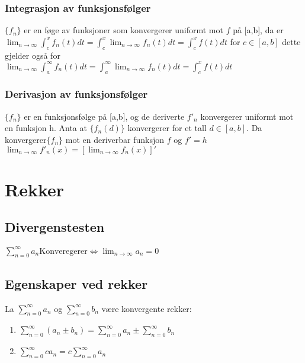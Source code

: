 \documentclass[8pt,a4paper,twocolumn,twoside]{article}
\begin{document}
            \subsubsection*{Integrasjon av funksjonsfølger}
            $\{f_n\}$ er en føge av funksjoner som konvergerer uniformt mot $f$ på [a,b], da er $\lim_{n\to\infty}\int_c^x f_n(t)dt = \int_c^x\lim_{n\to\infty}f_n(t)dt=\int_c^xf(t)dt$
            for $c \in [a,b]$ dette gjelder også for\\ $\lim_{n\to\infty}\int_a^\infty f_n(t)dt = \int_a^\infty\lim_{n\to\infty}f_n(t)dt=\int_c^xf(t)dt$
            \subsubsection*{Derivasjon av funksjonsfølger}
            $\{f_n\}$ er en funksjonsfølge på [a,b], og de deriverte $f'_n$ konvergerer uniformt mot en funksjon h. Anta 
            at $\{f_n(d)\}$ konvergerer for et tall $d\in [a,b]$. Da konvergerer$\{f_n\}$ mot en deriverbar funksjon $f$ og $f'=h$\\
            $\lim_{n\to\infty}f'_n(x)=[\lim_{n\to\infty}f_n(x)]'$
            
    \section*{Rekker}
        \subsection*{Divergenstesten}
        $\sum_{n=0}^\infty a_n \text{Konveregerer} \Leftrightarrow \lim_{n\to\infty}a_n=0$
        \subsection*{Egenskaper ved rekker}
        La $\sum_{n=0}^\infty a_n$ og $\sum_{n=0}^\infty b_n$ være konvergente rekker:
        \begin{enumerate}[topsep = 0pt,partopsep = 0pt, itemsep = 0cm]
            \item $\sum_{n=0}^\infty (a_n \pm b_n) = \sum_{n=0}^\infty a_n \pm \sum_{n=0}^\infty b_n$
            \item $\sum_{n=0}^\infty ca_n=c\sum_{n=0}^\infty a_n$
        \end{enumerate}
 
\end{document}
